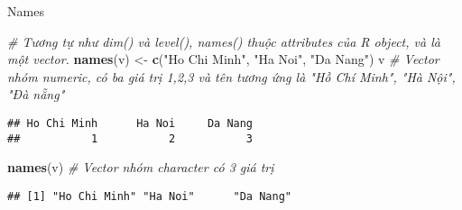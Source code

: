 \documentclass[
  ignorenonframetext,
]{beamer}
\newenvironment{Shaded}{}{}
\newcommand{\CommentTok}[1]{\textcolor[rgb]{0.38,0.63,0.69}{\textit{#1}}}
\newcommand{\KeywordTok}[1]{\textcolor[rgb]{0.00,0.44,0.13}{\textbf{#1}}}
\newcommand{\NormalTok}[1]{#1}
\newcommand{\StringTok}[1]{\textcolor[rgb]{0.25,0.44,0.63}{#1}}
\begin{document}
\begin{frame}[fragile]{Names}
\protect\hypertarget{names-2}{}

\begin{Shaded}
\begin{Highlighting}[]
\CommentTok{# Tương tự như dim() và level(), names() thuộc attributes của R object, và là một vector.}
\KeywordTok{names}\NormalTok{(v) <-}\StringTok{ }\KeywordTok{c}\NormalTok{(}\StringTok{"Ho Chi Minh"}\NormalTok{, }\StringTok{"Ha Noi"}\NormalTok{, }\StringTok{"Da Nang"}\NormalTok{) }
\NormalTok{v }\CommentTok{# Vector nhóm numeric, có ba giá trị 1,2,3 và tên tương ứng là "Hồ Chí Minh", "Hà Nội", "Đà nẵng"}
\end{Highlighting}
\end{Shaded}

\begin{verbatim}
## Ho Chi Minh      Ha Noi     Da Nang 
##           1           2           3
\end{verbatim}

\begin{Shaded}
\begin{Highlighting}[]
\KeywordTok{names}\NormalTok{(v) }\CommentTok{# Vector nhóm character có 3 giá trị}
\end{Highlighting}
\end{Shaded}

\begin{verbatim}
## [1] "Ho Chi Minh" "Ha Noi"      "Da Nang"
\end{verbatim}

\end{frame}
\end{document}
